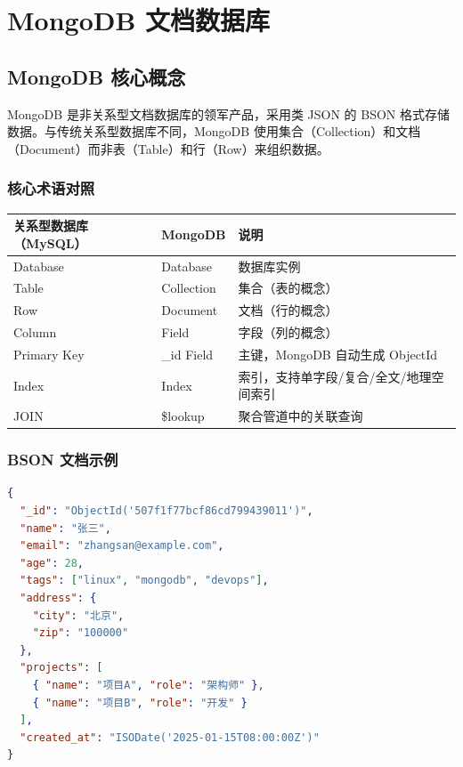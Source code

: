 \documentclass[12pt,UTF8]{ctexbook}
\begin{document}
\chapter{MongoDB 文档数据库}
\label{chap:mongodb}

\section{MongoDB 核心概念}
\label{sec:mongodb-core}

MongoDB 是非关系型文档数据库的领军产品，采用类 JSON 的 BSON 格式存储数据。与传统关系型数据库不同，MongoDB 使用集合（Collection）和文档（Document）而非表（Table）和行（Row）来组织数据。

\subsection*{核心术语对照}

\begin{tabular}{|l|l|l|}
\hline
\textbf{关系型数据库（MySQL）} & \textbf{MongoDB} & \textbf{说明} \\
\hline
Database & Database & 数据库实例 \\
\hline
Table & Collection & 集合（表的概念） \\
\hline
Row & Document & 文档（行的概念） \\
\hline
Column & Field & 字段（列的概念） \\
\hline
Primary Key & \_id Field & 主键，MongoDB 自动生成 ObjectId \\
\hline
Index & Index & 索引，支持单字段/复合/全文/地理空间索引 \\
\hline
JOIN & \$lookup & 聚合管道中的关联查询 \\
\hline
\end{tabular}

\subsection*{BSON 文档示例}

\begin{lstlisting}[language=json]
{
  "_id": "ObjectId('507f1f77bcf86cd799439011')",
  "name": "张三",
  "email": "zhangsan@example.com",
  "age": 28,
  "tags": ["linux", "mongodb", "devops"],
  "address": {
    "city": "北京",
    "zip": "100000"
  },
  "projects": [
    { "name": "项目A", "role": "架构师" },
    { "name": "项目B", "role": "开发" }
  ],
  "created_at": "ISODate('2025-01-15T08:00:00Z')"
}
\end{lstlisting}
\end{document}
